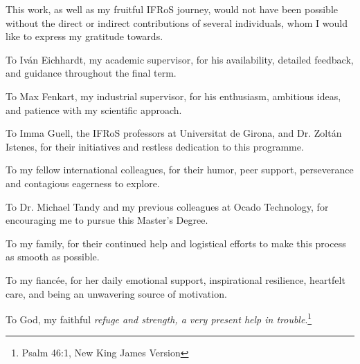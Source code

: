 This work, as well as my fruitful IFRoS journey, would not have been possible without the direct or indirect contributions of several individuals, whom I would like to express my gratitude towards.

To Iván Eichhardt, my academic supervisor, for his availability, detailed feedback, and guidance throughout the final term.

To Max Fenkart, my industrial supervisor, for his enthusiasm, ambitious ideas, and patience with my scientific approach.

To Imma Guell, the IFRoS professors at Universitat de Girona, and Dr. Zoltán Istenes, for their initiatives and restless dedication to this programme.

To my fellow international colleagues, for their humor, peer support, perseverance and contagious eagerness to explore.

To Dr. Michael Tandy and my previous colleagues at Ocado Technology, for encouraging me to pursue this Master's Degree.

To my family, for their continued help and logistical efforts to make this process as smooth as possible.

To my fiancée, for her daily emotional support, inspirational resilience, heartfelt care, and being an unwavering source of motivation.

To God, my faithful \emph{refuge and strength, a very present help in trouble}.\footnote{Psalm 46:1, New King James Version}

